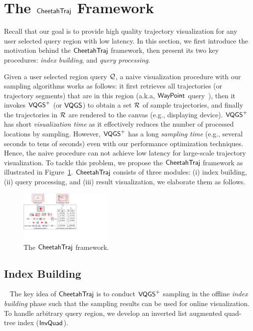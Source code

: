 \section{The $\mathsf{CheetahTraj}$ Framework}\label{sec:cheetahtraj}
Recall that our goal is to provide high quality trajectory visualization for any user selected query region with low latency.
In this section, we first introduce the motivation behind the $\mathsf{CheetahTraj}$ framework, then present its two key procedures: \textit{index building}, and \textit{query processing}.

Given a user selected region query $\mathcal{Q}$, a naive visualization procedure with our sampling algorithms works as follows:
it first retrieves all trajectories (or trajectory segments) that are in this region (a.k.a, $\mathsf{WayPoint}$ query~\cite{kruger2013trajectorylenses}),
then it invokes $\mathsf{VQGS}^+$ (or $\mathsf{VQGS}$) to obtain a set $\mathcal{R}$ of sample trajectories, and finally the trajectories in $\mathcal{R}$ are rendered to the canvas (e.g., displaying device).
$\mathsf{VQGS}^+$ has short \textit{visualization time} as it effectively reduces the number of processed locations by sampling. However, $\mathsf{VQGS}^+$ has a long \textit{sampling time} (e.g., several seconds to tens of seconds) even with our performance optimization techniques.
Hence, the naive procedure can not achieve low latency for large-scale trajectory visualization. To tackle this problem, we propose the $\mathsf{CheetahTraj}$ framework as illustrated in Figure~\ref{fig:framework}.  $\mathsf{CheetahTraj}$ consists of three modules: (i) \textsf{index building}, (ii) \textsf{query processing}, and (iii) \textsf{result visualization}, we elaborate them as follows.


\begin{figure}
	\centering
	\includegraphics[width=0.4\textwidth]{pictures/cheetahtraj}
    \trim
    \caption{The $\mathsf{CheetahTraj}$ framework.}
    \label{fig:framework}
    \trim
\end{figure}


\subsection{Index Building}~\label{sec:index}
The key idea of $\mathsf{CheetahTraj}$ is to conduct $\mathsf{VQGS}^+$ sampling in the offline \emph{index building} phase such that the sampling results can be used for online visualization. To handle arbitrary query region, we develop an inverted list augmented quad-tree index ($\mathsf{InvQuad}$).

